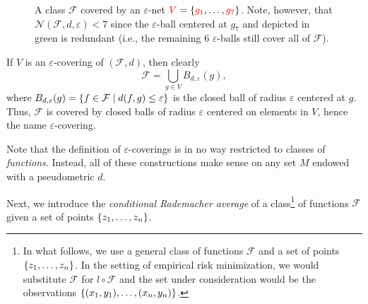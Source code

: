 \begin{figure}
    \centering
    \caption{%
         A class $\mathcal{F}$ covered by an $\varepsilon$-net ${\color{red} V} = \set{{\color{red} g_1}, \dots, {\color{red} g_7}}$. Note, however, that $\mathcal{N}(\mathcal{F}, d, \varepsilon) < 7$ since the $\varepsilon$-ball centered at $g_7$ and depicted in green is redundant (i.e., the remaining 6 $\varepsilon$-balls still cover all of $\mathcal{F}$).
    }
    \label{fig: epsilon-net}
\end{figure}

If $V$ is an $\varepsilon$-covering of $(\mathcal{F}, d)$, then clearly
\[
    \mathcal{F} = \bigcup_{g \in V} B_{d, \varepsilon}(g),
\]
where $B_{d, \varepsilon}(g) = \set{f \in \mathcal{F} \with d(f, g) \leq \varepsilon}$ is the closed ball of radius $\varepsilon$ centered at $g$. Thus, $\mathcal{F}$ is covered by closed balls of radius $\varepsilon$ centered on elements in $V$, hence the name $\varepsilon$-covering.

Note that the definition of $\varepsilon$-coverings is in no way restricted to classes of \emph{functions}. Instead, all of these constructions make sense on any set $M$ endowed with a pseudometric $d$.

Next, we introduce the \emph{conditional Rademacher average} of a class\footnote{In what follows, we use a general class of functions $\mathcal{F}$ and a set of points $\set{z_1, \dots, z_n}$. In the setting of empirical risk minimization, we would substitute $\mathcal{F}$ for $l \circ \mathcal{F}$ and the set under consideration would be the observations $\set{(x_1, y_1), \dots, (x_n, y_n)}$.} of functions $\mathcal{F}$ given a set of points $\set{z_1, \dots, z_n}$.

